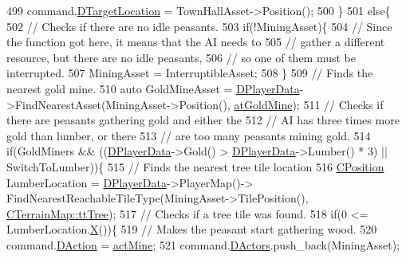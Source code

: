 \begin{DoxyCode}
499             command.\hyperlink{structSPlayerCommandRequest_a701702b94ca2fd2738e95ef6711dd41a}{DTargetLocation} = TownHallAsset->Position();
500         \}
501         \textcolor{keywordflow}{else}\{
502             \textcolor{comment}{// Checks if there are no idle peasants.}
503             \textcolor{keywordflow}{if}(!MiningAsset)\{
504                 \textcolor{comment}{// Since the function got here, it means that the AI needs to }
505                 \textcolor{comment}{// gather a different resource, but there are no idle peasants,}
506                 \textcolor{comment}{// so one of them must be interrupted.}
507                 MiningAsset = InterruptibleAsset;   
508             \}
509             \textcolor{comment}{// Finds the nearest gold mine.}
510             \textcolor{keyword}{auto} GoldMineAsset = \hyperlink{classCAIPlayer_a83b5113c8f7e80df54940b647c5ee2e6}{DPlayerData}->FindNearestAsset(MiningAsset->Position(), 
      \hyperlink{GameDataTypes_8h_a5600d4fc433b83300308921974477feca243d9ba44092eadd561db058d742b3b3}{atGoldMine});
511             \textcolor{comment}{// Checks if there are peasants gathering gold and either the }
512             \textcolor{comment}{// AI has three times more gold than lumber, or there }
513             \textcolor{comment}{// are too many peasants mining gold.}
514             \textcolor{keywordflow}{if}(GoldMiners && ((\hyperlink{classCAIPlayer_a83b5113c8f7e80df54940b647c5ee2e6}{DPlayerData}->Gold() > \hyperlink{classCAIPlayer_a83b5113c8f7e80df54940b647c5ee2e6}{DPlayerData}->Lumber() * 3) || 
      SwitchToLumber))\{
515                 \textcolor{comment}{// Finds the nearest tree tile location}
516                 \hyperlink{classCPosition}{CPosition} LumberLocation = \hyperlink{classCAIPlayer_a83b5113c8f7e80df54940b647c5ee2e6}{DPlayerData}->PlayerMap()->
      FindNearestReachableTileType(MiningAsset->TilePosition(), \hyperlink{classCTerrainMap_aff2ab991e237269941416dd79d8871d4a15600fc22dc08ff5a3aec20930112f8c}{CTerrainMap::ttTree});
517                 \textcolor{comment}{// Checks if a tree tile was found.}
518                 \textcolor{keywordflow}{if}(0 <= LumberLocation.\hyperlink{classCPosition_a9a6b94d3b91df1492d166d9964c865fc}{X}())\{
519                     \textcolor{comment}{// Makes the peasant start gathering wood.}
520                     command.\hyperlink{structSPlayerCommandRequest_a80897bbccf2c4e0b148a7aa815a926c6}{DAction} = \hyperlink{GameDataTypes_8h_a35b98ce26aca678b03c6f9f76e4778cea2e0db284fd05caa56e3867c661ccdd8b}{actMine};
521                     command.\hyperlink{structSPlayerCommandRequest_aa37fc01519676345703d78b9f573894a}{DActors}.push\_back(MiningAsset);

\end{DoxyCode}
